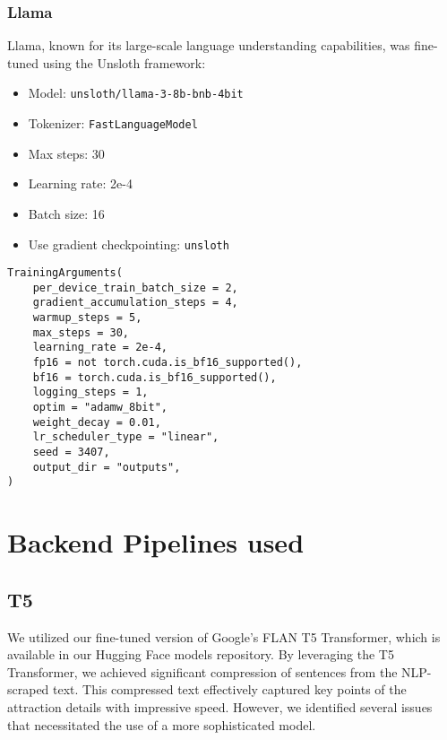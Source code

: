 \documentclass[conference]{IEEEtran}
\begin{document}
        \subsubsection{Llama}

            Llama, known for its large-scale language understanding capabilities, was fine-tuned using the Unsloth framework:
            \begin{itemize}
                \item Model: \texttt{unsloth/llama-3-8b-bnb-4bit}
                \item Tokenizer: \texttt{FastLanguageModel}
                \item Max steps: 30
                \item Learning rate: 2e-4
                \item Batch size: 16
                \item Use gradient checkpointing: \texttt{unsloth}
            \end{itemize}

\begin{tcolorbox}[linewidth=0.5pt, innerleftmargin=10pt, innerrightmargin=10pt, innertopmargin=10pt, innerbottommargin=10pt, fontupper=\footnotesize]
\begin{verbatim}
TrainingArguments(
    per_device_train_batch_size = 2,
    gradient_accumulation_steps = 4,
    warmup_steps = 5,
    max_steps = 30,
    learning_rate = 2e-4,
    fp16 = not torch.cuda.is_bf16_supported(),
    bf16 = torch.cuda.is_bf16_supported(),
    logging_steps = 1,
    optim = "adamw_8bit",
    weight_decay = 0.01,
    lr_scheduler_type = "linear",
    seed = 3407,
    output_dir = "outputs",
)
\end{verbatim}
\end{tcolorbox}


\section{Backend Pipelines used}

    \subsection{T5}

        We utilized our fine-tuned version of Google's FLAN T5 Transformer, which is available in our Hugging Face models repository. By leveraging the T5 Transformer, we achieved significant compression of sentences from the NLP-scraped text. This compressed text effectively captured key points of the attraction details with impressive speed. However, we identified several issues that necessitated the use of a more sophisticated model.
\end{document}
